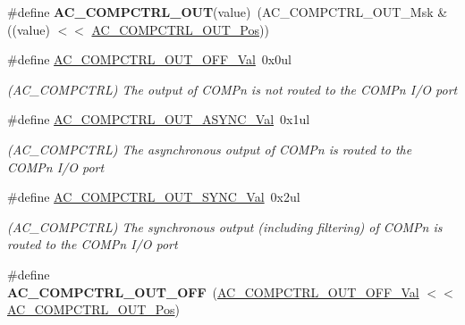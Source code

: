 \begin{DoxyCompactItemize}
\item 
\hypertarget{group___s_a_m_l21___a_c_ga3ed41b4d257381f3fecd256c0b1d820e}{}\#define {\bfseries A\+C\+\_\+\+C\+O\+M\+P\+C\+T\+R\+L\+\_\+\+O\+U\+T}(value)~(A\+C\+\_\+\+C\+O\+M\+P\+C\+T\+R\+L\+\_\+\+O\+U\+T\+\_\+\+Msk \& ((value) $<$$<$ \hyperlink{group___s_a_m_l21___a_c_ga6dfe864873a0eadaba8922ecf4b25ed1}{A\+C\+\_\+\+C\+O\+M\+P\+C\+T\+R\+L\+\_\+\+O\+U\+T\+\_\+\+Pos}))\label{group___s_a_m_l21___a_c_ga3ed41b4d257381f3fecd256c0b1d820e}

\item 
\hypertarget{group___s_a_m_l21___a_c_gaf53c9e960f0c4a3279b6068973c65cc7}{}\#define \hyperlink{group___s_a_m_l21___a_c_gaf53c9e960f0c4a3279b6068973c65cc7}{A\+C\+\_\+\+C\+O\+M\+P\+C\+T\+R\+L\+\_\+\+O\+U\+T\+\_\+\+O\+F\+F\+\_\+\+Val}~0x0ul\label{group___s_a_m_l21___a_c_gaf53c9e960f0c4a3279b6068973c65cc7}

\begin{DoxyCompactList}\small\item\em (A\+C\+\_\+\+C\+O\+M\+P\+C\+T\+R\+L) The output of C\+O\+M\+Pn is not routed to the C\+O\+M\+Pn I/\+O port \end{DoxyCompactList}\item 
\hypertarget{group___s_a_m_l21___a_c_ga45c6b70bb8a6f53dc173f631c9ac7fca}{}\#define \hyperlink{group___s_a_m_l21___a_c_ga45c6b70bb8a6f53dc173f631c9ac7fca}{A\+C\+\_\+\+C\+O\+M\+P\+C\+T\+R\+L\+\_\+\+O\+U\+T\+\_\+\+A\+S\+Y\+N\+C\+\_\+\+Val}~0x1ul\label{group___s_a_m_l21___a_c_ga45c6b70bb8a6f53dc173f631c9ac7fca}

\begin{DoxyCompactList}\small\item\em (A\+C\+\_\+\+C\+O\+M\+P\+C\+T\+R\+L) The asynchronous output of C\+O\+M\+Pn is routed to the C\+O\+M\+Pn I/\+O port \end{DoxyCompactList}\item 
\hypertarget{group___s_a_m_l21___a_c_ga85ea47206d4f4b7d3b3a59244ae48705}{}\#define \hyperlink{group___s_a_m_l21___a_c_ga85ea47206d4f4b7d3b3a59244ae48705}{A\+C\+\_\+\+C\+O\+M\+P\+C\+T\+R\+L\+\_\+\+O\+U\+T\+\_\+\+S\+Y\+N\+C\+\_\+\+Val}~0x2ul\label{group___s_a_m_l21___a_c_ga85ea47206d4f4b7d3b3a59244ae48705}

\begin{DoxyCompactList}\small\item\em (A\+C\+\_\+\+C\+O\+M\+P\+C\+T\+R\+L) The synchronous output (including filtering) of C\+O\+M\+Pn is routed to the C\+O\+M\+Pn I/\+O port \end{DoxyCompactList}\item 
\hypertarget{group___s_a_m_l21___a_c_ga7b4eaee3d8d3b3eb5d7cb31840d59940}{}\#define {\bfseries A\+C\+\_\+\+C\+O\+M\+P\+C\+T\+R\+L\+\_\+\+O\+U\+T\+\_\+\+O\+F\+F}~(\hyperlink{group___s_a_m_l21___a_c_gaf53c9e960f0c4a3279b6068973c65cc7}{A\+C\+\_\+\+C\+O\+M\+P\+C\+T\+R\+L\+\_\+\+O\+U\+T\+\_\+\+O\+F\+F\+\_\+\+Val}       $<$$<$ \hyperlink{group___s_a_m_l21___a_c_ga6dfe864873a0eadaba8922ecf4b25ed1}{A\+C\+\_\+\+C\+O\+M\+P\+C\+T\+R\+L\+\_\+\+O\+U\+T\+\_\+\+Pos})\label{group___s_a_m_l21___a_c_ga7b4eaee3d8d3b3eb5d7cb31840d59940}


\end{DoxyCompactItemize}
